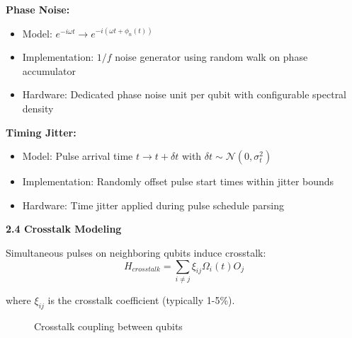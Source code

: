 \documentclass[12pt,a4paper]{article}
\begin{document}
\textbf{Phase Noise:}
\begin{itemize}[noitemsep]
\item Model: $e^{-i\omega t} \rightarrow e^{-i(\omega t + \phi_n(t))}$
\item Implementation: $1/f$ noise generator using random walk on phase accumulator
\item Hardware: Dedicated phase noise unit per qubit with configurable spectral density
\end{itemize}

\textbf{Timing Jitter:}
\begin{itemize}[noitemsep]
\item Model: Pulse arrival time $t \rightarrow t + \delta t$ with $\delta t \sim \mathcal{N}(0, \sigma_t^2)$
\item Implementation: Randomly offset pulse start times within jitter bounds
\item Hardware: Time jitter applied during pulse schedule parsing
\end{itemize}

\textbf{2.4 Crosstalk Modeling}

Simultaneous pulses on neighboring qubits induce crosstalk:
\begin{equation}
H_{crosstalk} = \sum_{i \neq j} \xi_{ij} \Omega_i(t) O_j
\end{equation}

where $\xi_{ij}$ is the crosstalk coefficient (typically 1-5\%).

\begin{figure}[h]
\centering
{}
\caption{Crosstalk coupling between qubits}
\label{fig:crosstalk}
\end{figure}
\end{document}
